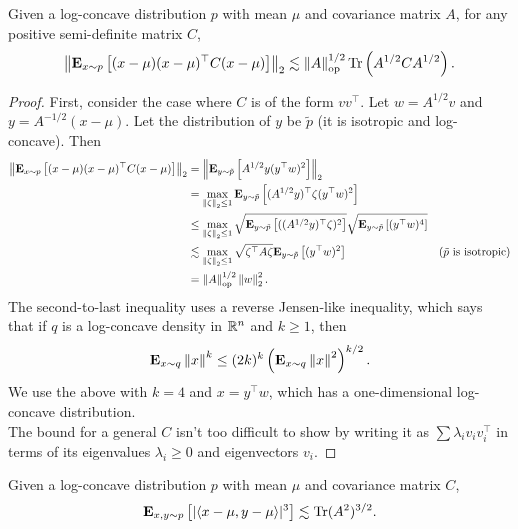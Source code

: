 		\begin{lemma}
			\label{lee-vem: growth lemma 1}
			Given a log-concave distribution $p$ with mean $\mu$ and covariance matrix $A$, for any positive semi-definite matrix $C$,
			\[ \left\lVert\textbf{E}_{x\sim p}\left[(x-\mu)(x-\mu)^\top C (x-\mu)\right]\right\rVert_2 \lesssim \left\lVert A\right\rVert_{\text{op}}^{1/2} \operatorname{Tr}\left(A^{1/2}CA^{1/2}\right). \]
		\end{lemma}
		\begin{proof}
			First, consider the case where $C$ is of the form $vv^\top$. Let $w = A^{1/2}v$ and $y = A^{-1/2}(x-\mu)$. Let the distribution of $y$ be $\tilde{p}$ (it is isotropic and log-concave). Then
			\begin{align*}
				\left\lVert\textbf{E}_{x \sim p}\left[(x-\mu)(x-\mu)^\top C (x-\mu)\right]\right\rVert_2 &= \left\lVert\textbf{E}_{y\sim \tilde{p}}\left[A^{1/2}y(y^\top w)^2\right]\right\rVert_2 \\
					&= \max_{\left\lVert\zeta\right\rVert_2 \leq 1} \textbf{E}_{y\sim\tilde{p}}\left[(A^{1/2}y)^\top \zeta (y^\top w)^2\right] \\
					&\leq \max_{\left\lVert\zeta\right\rVert_2 \leq 1} \sqrt{\textbf{E}_{y\sim\tilde{p}}\left[((A^{1/2}y)^\top \zeta)^2\right]} \sqrt{\textbf{E}_{y\sim\tilde{p}} \left[(y^\top w)^4\right]} \\
					&\lesssim \max_{\left\lVert\zeta\right\rVert_2 \leq 1} \sqrt{\zeta^\top A \zeta} \textbf{E}_{y \sim \tilde{p}} \left[(y^\top w)^2\right] & (\tilde{p}\text{ is isotropic}) \\
					&= \left\lVert A\right\rVert_{\text{op}}^{1/2} \left\lVert w\right\rVert_2^2.
			\end{align*}
			The second-to-last inequality uses a reverse Jensen-like inequality, which says that if $q$ is a log-concave density in $\mathbb{R}^n$ and $k\geq 1$, then
			\[ \textbf{E}_{x \sim q} \left\lVert x\right\rVert^k \leq (2k)^k \left(\textbf{E}_{x \sim q} \left\lVert x\right\rVert^2 \right)^{k/2}. \]
			We use the above with $k=4$ and $x = y^\top w$, which has a one-dimensional log-concave distribution.\\
			The bound for a general $C$ isn't too difficult to show by writing it as $\sum \lambda_i v_i v_i^\top$ in terms of its eigenvalues $\lambda_i \geq 0$ and eigenvectors $v_i$.
		\end{proof}

		\begin{lemma}
			\label{lee-vem: growth lemma 2}
			Given a log-concave distribution $p$ with mean $\mu$ and covariance matrix $C$,
			\[ \textbf{E}_{x,y \sim p} \left[ |\langle x-\mu,y-\mu\rangle|^3 \right] \lesssim \operatorname{Tr}(A^2)^{3/2}. \]
		\end{lemma}

